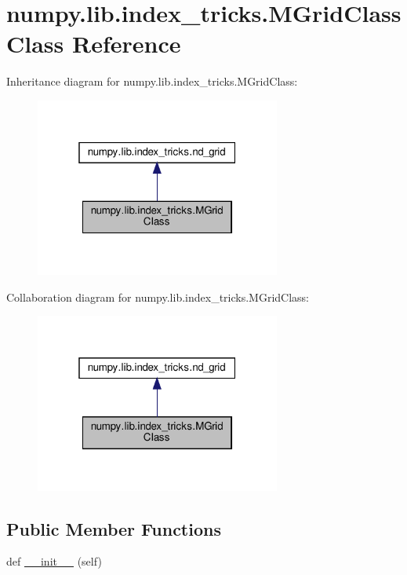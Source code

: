 \hypertarget{classnumpy_1_1lib_1_1index__tricks_1_1MGridClass}{}\section{numpy.\+lib.\+index\+\_\+tricks.\+M\+Grid\+Class Class Reference}
\label{classnumpy_1_1lib_1_1index__tricks_1_1MGridClass}


Inheritance diagram for numpy.\+lib.\+index\+\_\+tricks.\+M\+Grid\+Class\+:
\nopagebreak
\begin{figure}[H]
\begin{center}
\leavevmode
\includegraphics[width=229pt]{classnumpy_1_1lib_1_1index__tricks_1_1MGridClass__inherit__graph}
\end{center}
\end{figure}


Collaboration diagram for numpy.\+lib.\+index\+\_\+tricks.\+M\+Grid\+Class\+:
\nopagebreak
\begin{figure}[H]
\begin{center}
\leavevmode
\includegraphics[width=229pt]{classnumpy_1_1lib_1_1index__tricks_1_1MGridClass__coll__graph}
\end{center}
\end{figure}
\subsection*{Public Member Functions}
\begin{DoxyCompactItemize}
\item 
def \hyperlink{classnumpy_1_1lib_1_1index__tricks_1_1MGridClass_adfcb1a11c90df28525beb376948fdef1}{\+\_\+\+\_\+init\+\_\+\+\_\+} (self)
\end{DoxyCompactItemize}
